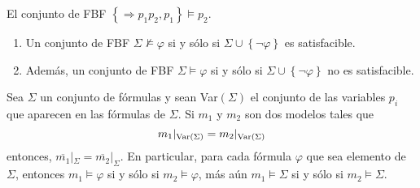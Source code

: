 \documentclass[12pt]{report}
\theoremstyle{largebreak}
\begin{document}
    \begin{exa}
        El conjunto  de FBF $\left\{\Rightarrow p_1 p_2, p_1\right\}\vDash p_2$.
    \end{exa}

    \begin{obs}
        \begin{enumerate}
            Se tiene lo siguiente:
            \item Un conjunto de FBF $\Sigma\nvDash\varphi$ si y sólo si $\Sigma\cup\left\{\neg\varphi \right\}$ es satisfacible.
            \item Además, un conjunto de FBF $\Sigma\vDash\varphi$ si y sólo si $\Sigma\cup\left\{\neg\varphi \right\}$ no es satisfacible.
        \end{enumerate}
    \end{obs}

    \begin{lema}
        Sea $\Sigma$ un conjunto de fórmulas y sean Var$(\Sigma)$ el conjunto de las variables $p_i$ que aparecen en las fórmulas de $\Sigma$. Si $m_1$ y $m_2$ son dos modelos tales que
        \begin{equation*}
            m_1|_{\textup{Var}(\Sigma)}=m_2|_{\textup{Var}(\Sigma)}
        \end{equation*}
        entonces, $\overline{m_1}|_{\Sigma}=\overline{m_2}|_{\Sigma}$. En particular, para cada fórmula $\varphi$ que sea elemento de $\Sigma$, entonces $m_1\vDash\varphi$ si y sólo si $m_2\vDash\varphi$, más aún $m_1\vDash\Sigma$ si y sólo si $m_2\vDash\Sigma$.
    \end{lema}
\end{document}
